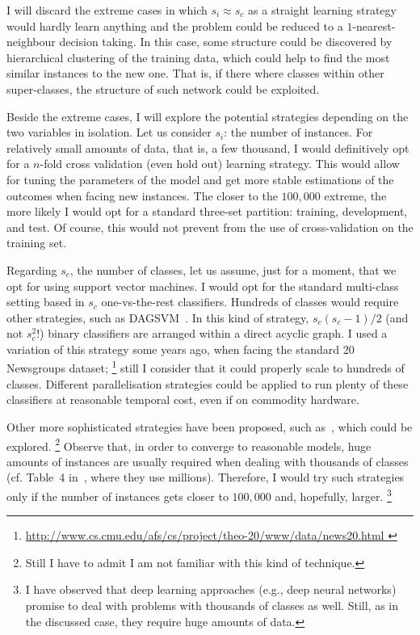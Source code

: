 \documentclass{sig-alternate-05-2015}
\begin{document}
I will discard the extreme cases in which $s_i\approx s_c$ as a straight 
learning strategy would hardly learn anything and the problem could be reduced 
to a $1$-nearest-neighbour decision taking. In this case, some structure could 
be discovered by hierarchical clustering of the training data, which could help 
to find the most similar instances to the new one. That is, if there where 
classes within other super-classes, the structure of such network could be 
exploited.

Beside the extreme cases, I will explore the potential strategies depending on 
the two variables in isolation. Let us consider $s_i$: the number of instances. 
For relatively small amounts of data, that is, a few thousand, I would 
definitively opt for a $n$-fold cross validation (even hold out) learning 
strategy. This would allow for tuning the 
parameters of the model and get more stable estimations of the outcomes when 
facing new instances. The closer to the $100,000$ extreme, the more likely I 
would opt for a standard three-set partition: training, development, and test. 
Of course, this would not prevent from the use of cross-validation on the 
training set. 

Regarding $s_c$, the number of classes, let us assume, just for a moment, that 
we opt for using support vector machines. I would opt for the standard 
multi-class setting based in $s_c$ one-vs-the-rest classifiers. Hundreds of 
classes would require other strategies, such as 
DAGSVM~\cite{large-margin-dags-for-multiclass-classification}. In this kind of 
strategy, $s_c(s_c-1)/2$ (and not $s_c^2$!) binary classifiers are arranged 
within a direct acyclic graph. I used a variation of this strategy some years 
ago, when facing the standard 20 Newsgroups dataset;%
\footnote{\url{http://www.cs.cmu.edu/afs/cs/project/theo-20/www/data/news20.html
}}
still I consider that it could properly scale to hundreds of classes. Different 
parallelisation strategies could be applied to run plenty of these classifiers 
at reasonable temporal cost, even if on commodity hardware.


Other more sophisticated strategies have been proposed, such 
as~\cite{JMLR:v15:gupta14a}, which could be explored.%
\footnote{Still I have to admit I am not familiar with this kind of technique.}
Observe that, in order to converge to reasonable models, huge amounts of 
instances are usually required when dealing with thousands of classes (cf. 
Table~4 in~\cite{JMLR:v15:gupta14a}, where they use millions). Therefore, I 
would try such strategies only if the number of instances gets closer to 
$100,000$ and, hopefully, larger.%
\footnote{I have observed that deep learning approaches (e.g., deep 
neural networks) promise to deal with problems with thousands of classes as 
well. Still, as in the discussed case, they require huge amounts of 
data.}
\end{document}
